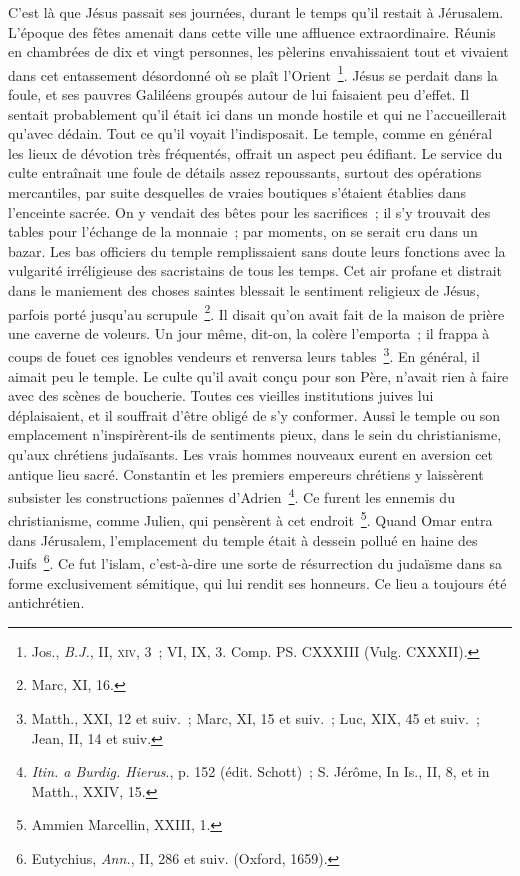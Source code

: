 \documentclass[french,twoside]{book} %
\begin{document}
C’est là que Jésus passait ses journées, durant le temps qu’il restait à Jérusalem. L’époque des fêtes amenait dans cette ville une affluence extraordinaire. Réunis en chambrées de dix et vingt personnes, les pèlerins envahissaient tout et vivaient dans cet entassement désordonné où se plaît l’Orient \footnote{ Jos., {\itshape B.J.}, II, \textsc{xiv}, 3 ; VI, IX, 3. Comp. PS. CXXXIII (Vulg. CXXXII).}. Jésus se perdait dans la foule, et ses pauvres Galiléens groupés autour de lui faisaient peu d’effet. Il sentait probablement qu’il était ici dans un monde hostile et qui ne l’accueillerait qu’avec dédain. Tout ce qu’il voyait l’indisposait. Le temple, comme en général les lieux de dévotion très fréquentés, offrait un aspect peu édifiant. Le service du culte entraînait une foule de détails assez repoussants, surtout des opérations mercantiles, par suite desquelles de vraies boutiques s’étaient établies dans l’enceinte sacrée. On y vendait des bêtes pour les sacrifices ; il s’y trouvait des tables pour l’échange de la monnaie ; par moments, on se serait cru dans un bazar. Les bas officiers du temple remplissaient sans doute leurs fonctions avec la vulgarité irréligieuse des sacristains de tous les temps. Cet air profane et distrait dans le maniement des choses saintes blessait le sentiment religieux de Jésus, parfois porté jusqu’au scrupule \footnote{Marc, XI, 16.}. Il disait qu’on avait fait de la maison de prière une caverne de voleurs. Un jour même, dit-on, la colère l’emporta ; il frappa à coups de fouet ces ignobles vendeurs et renversa leurs tables \footnote{Matth., XXI, 12 et suiv. ; Marc, XI, 15 et suiv. ; Luc, XIX, 45 et suiv. ; Jean, II, 14 et suiv.}. En général, il aimait peu le temple. Le culte qu’il avait conçu pour son Père, n’avait rien à faire avec des scènes de boucherie. Toutes ces vieilles institutions juives lui déplaisaient, et il souffrait d’être obligé de s’y conformer. Aussi le temple ou son emplacement n’inspirèrent-ils de sentiments pieux, dans le sein du christianisme, qu’aux chrétiens judaïsants. Les vrais hommes nouveaux eurent en aversion cet antique lieu sacré. Constantin et les premiers empereurs chrétiens y laissèrent subsister les constructions païennes d’Adrien \footnote{{\itshape Itin. a Burdig. Hierus}., p. 152 (édit. Schott) ; S. Jérôme, In Is., II, 8, et in Matth., XXIV, 15.}. Ce furent les ennemis du christianisme, comme Julien, qui pensèrent à cet endroit \footnote{Ammien Marcellin, XXIII, 1.}. Quand Omar entra dans Jérusalem, l’emplacement du temple était à dessein pollué en haine des Juifs \footnote{ Eutychius, {\itshape Ann.}, II, 286 et suiv. (Oxford, 1659).}. Ce fut l’islam, c’est-à-dire une sorte de résurrection du judaïsme dans sa forme exclusivement sémitique, qui lui rendit ses honneurs. Ce lieu a toujours été antichrétien.\par
\end{document}
